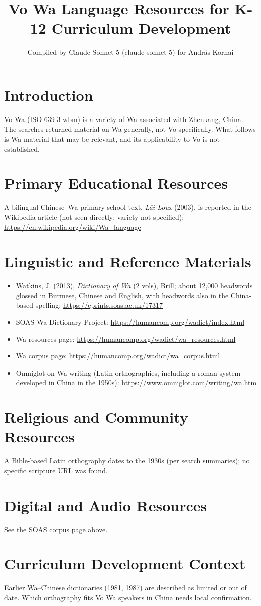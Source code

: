 \documentclass[12pt]{article}
\title{Vo Wa Language Resources for K-12 Curriculum Development}
\author{Compiled by Claude Sonnet 5 (claude-sonnet-5) for Andr\'as Kornai}
\date{}
\begin{document}
\maketitle
\section{Introduction}
Vo Wa (ISO 639-3 wbm) is a variety of Wa associated with Zhenkang, China. The searches returned material on Wa generally, not Vo specifically. What follows is Wa material that may be relevant, and its applicability to Vo is not established.
\section{Primary Educational Resources}
A bilingual Chinese--Wa primary-school text, \emph{L\=ai Loux} (2003), is reported in the Wikipedia article (not seen directly; variety not specified): \url{https://en.wikipedia.org/wiki/Wa_language}
\section{Linguistic and Reference Materials}
\begin{itemize}
\item Watkins, J. (2013), \emph{Dictionary of Wa} (2 vols), Brill; about 12,000 headwords glossed in Burmese, Chinese and English, with headwords also in the China-based spelling: \url{https://eprints.soas.ac.uk/17317}
\item SOAS Wa Dictionary Project: \url{https://humancomp.org/wadict/index.html}
\item Wa resources page: \url{https://humancomp.org/wadict/wa_resources.html}
\item Wa corpus page: \url{https://humancomp.org/wadict/wa_corpus.html}
\item Omniglot on Wa writing (Latin orthographies, including a roman system developed in China in the 1950s): \url{https://www.omniglot.com/writing/wa.htm}
\end{itemize}
\section{Religious and Community Resources}
A Bible-based Latin orthography dates to the 1930s (per search summaries); no specific scripture URL was found.
\section{Digital and Audio Resources}
See the SOAS corpus page above.
\section{Curriculum Development Context}
Earlier Wa--Chinese dictionaries (1981, 1987) are described as limited or out of date. Which orthography fits Vo Wa speakers in China needs local confirmation.
\end{document}
